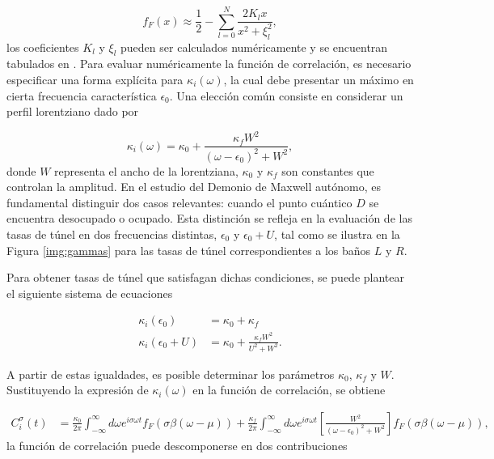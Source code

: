 \begin{appendixs}
\begin{equation}
    f_{F}(x) \approx \frac{1}{2} - \sum_{l=0}^{N} \frac{ 2 K_{l}x }{ x^{2} + \xi^{2}_{l} },
    \label{apendix5:pade}
\end{equation}
los coeficientes $K_{l}$ y $\xi_{l}$ pueden ser calculados numéricamente y se encuentran tabulados en \cite{hu2011pade}. Para evaluar numéricamente la función de correlación, es necesario especificar una forma explícita para $\kappa_{i}(\omega)$, la cual debe presentar un máximo en cierta frecuencia característica $\epsilon_{0}$. Una elección común consiste en considerar un perfil lorentziano dado por

\begin{equation*}
    \kappa_{i}(\omega) = \kappa_{0} + \frac{\kappa_{f} W^{2}}{(\omega - \epsilon_{0})^{2} + W^{2}},
\end{equation*}
donde $W$ representa el ancho de la lorentziana, $\kappa_{0}$ y $\kappa_{f}$ son constantes que controlan la amplitud. En el estudio del Demonio de Maxwell autónomo, es fundamental distinguir dos casos relevantes: cuando el punto cuántico $D$ se encuentra desocupado o ocupado. Esta distinción se refleja en la evaluación de las tasas de túnel en dos frecuencias distintas, $\epsilon_{0}$ y $\epsilon_{0} + U$, tal como se ilustra en la Figura \ref{img:gammas} para las tasas de túnel correspondientes a los baños $L$ y $R$.


Para obtener tasas de túnel que satisfagan dichas condiciones, se puede plantear el siguiente sistema de ecuaciones 

\begin{align*}
    \kappa_{i}(\epsilon_{0}) & = \kappa_{0} + \kappa_{f} \\
    \kappa_{i}(\epsilon_{0} + U) & = \kappa_{0} + \frac{\kappa_{f} W^{2} }{U^{2} + W^{2}}.
\end{align*}

A partir de estas igualdades, es posible determinar los parámetros $\kappa_{0}$, $\kappa_{f}$ y $W$. Sustituyendo la expresión de $\kappa_{i}(\omega)$ en la función de correlación, se obtiene

\begin{align*}
    C^{\sigma}_{i}(t) & = \frac{\kappa_{0}}{2\pi} \int_{-\infty}^{\infty}d\omega e^{i\sigma \omega t} f_{F}(\sigma \beta (\omega-\mu)) + \frac{\kappa_{f}}{2\pi} \int_{-\infty}^{\infty}d\omega e^{i\sigma \omega t}\left[ \frac{W^{2}}{(\omega-\epsilon_{0})^{2} + W^{2}} \right] f_{F}(\sigma \beta (\omega-\mu)),
\end{align*}
la función de correlación puede descomponerse en dos contribuciones


\end{appendixs}
